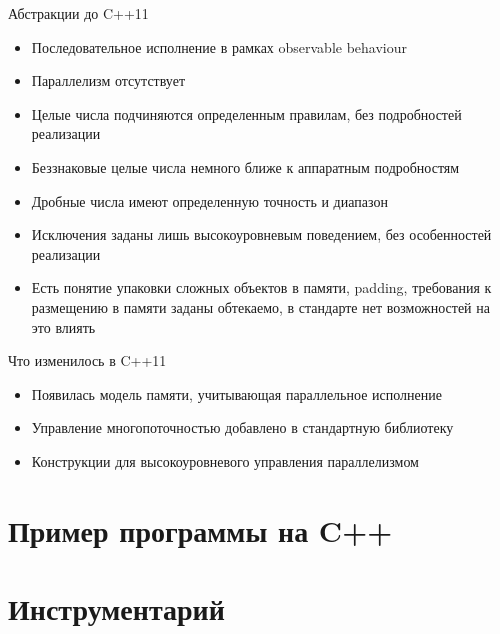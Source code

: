 \documentclass{beamer}
\begin{document}
\begin{frame}{Абстракции до C++11}
\begin{itemize}
  \item Последовательное исполнение в рамках observable behaviour
  \item Параллелизм отсутствует
  \item Целые числа подчиняются определенным правилам, без подробностей реализации
  \item Беззнаковые целые числа немного ближе к аппаратным подробностям
  \item Дробные числа имеют определенную точность и диапазон
  \item Исключения заданы лишь высокоуровневым поведением, без особенностей реализации
  \item Есть понятие упаковки сложных объектов в памяти, padding, требования к размещению в памяти заданы обтекаемо, в стандарте нет возможностей на это влиять
\end{itemize}
\end{frame}

\begin{frame}{Что изменилось в C++11}
\begin{itemize}
  \item Появилась модель памяти, учитывающая параллельное исполнение \vspace{3em}
  \item Управление многопоточностью добавлено в стандартную библиотеку \vspace{3em}
  \item Конструкции для высокоуровневого управления параллелизмом \vspace{3em}
\end{itemize}
\end{frame}

\section{Пример программы на C++}

\begin{frame}[fragile]{Пример программы на C++}
C++}]{examples/hello_world.cpp}
\end{frame}

\section{Инструментарий}
\end{document}

